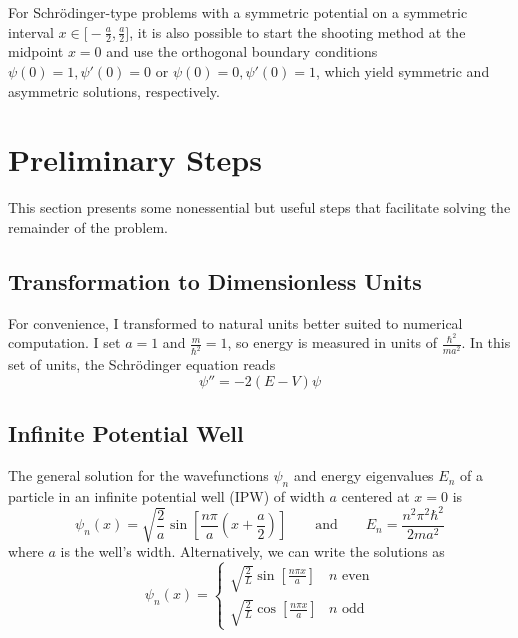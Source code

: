 \documentclass[11pt, a4paper]{article}
\newcommand{\eqtext}[1]{\qquad \text{#1} \qquad}
\newcommand{\schro}{Schr\"{o}dinger\xspace}
\begin{document}
\vspace{2mm}

For \schro-type problems with a symmetric potential on a symmetric interval $ x \in \big[-\frac{a}{2}, \frac{a}{2}\big] $, it is also possible to start the shooting method at the midpoint $ x = 0 $ and use the orthogonal boundary conditions $ \psi(0) = 1, \psi'(0) = 0 $ or $ \psi(0) = 0, \psi'(0) = 1 $, which yield symmetric and asymmetric solutions, respectively.


\section{Preliminary Steps}  \label{bvp:s:solution}
This section presents some nonessential but useful steps that facilitate solving the remainder of the problem.


\subsection{Transformation to Dimensionless Units}
For convenience, I transformed to natural units better suited to numerical computation. I set $ a = 1 $ and $ \frac{m}{\hbar^{2}} = 1 $, so energy is measured in units of $ \frac{\hbar^{2}}{ma^{2}} $. In this set of units, the \schro equation reads
\begin{equation*}
	\psi'' = -2(E-V)\psi
\end{equation*}


\subsection{Infinite Potential Well}
The general solution for the wavefunctions $ \psi_{n} $ and energy eigenvalues $ E_{n} $ of a particle in an infinite potential well (IPW) of width $ a $ centered at $ x = 0 $ is
\begin{equation*}
	\psi_{n}(x) = \sqrt{\frac{2}{a}}\sin\left[\frac{n\pi}{a}\left(x + \frac{a}{2}\right)\right] \eqtext{and} E_{n} = \frac{n^{2}\pi^{2}\hbar^{2}}{2ma^{2}}
\end{equation*}
where $ a $ is the well's width. Alternatively, we can write the solutions as
\begin{equation*}
	\psi_{n}(x) = 
	\begin{cases}
		\sqrt{\frac{2}{L}}\sin\left[\frac{n\pi x}{a}\right] & n \text{ even}\\
		\sqrt{\frac{2}{L}}\cos\left[\frac{n\pi x}{a}\right] & n \text{ odd}
	\end{cases}
\end{equation*}
\end{document}

